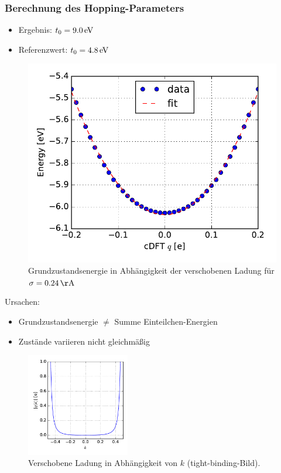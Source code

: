 \begin{frame}
\frametitle{Berechnung des Hopping-Parameters}
\begin{minipage}{0.49\textwidth}
\begin{itemize}
\setlength{\itemsep}{.5cm}
\item Ergebnis: $t_0 = \unit[9.0]{eV}$
\item Referenzwert: $t_0 = \unit[4.8]{eV}$
\end{itemize}
\end{minipage}
\begin{minipage}{0.49\textwidth}
\begin{figure}
\centering
\includegraphics[width = \textwidth]{Images/Hydrogen/charging/energy_fit_normal_sigma}
\caption{Grundzustandsenergie in Abhängigkeit der verschobenen Ladung für $\sigma = \unit[0.24]{\AA}$}
\label{}
\end{figure}
\end{minipage}
\end{frame}

\begin{frame}
Ursachen:
\begin{itemize}
\item Grundzustandsenergie $\neq$ Summe Einteilchen-Energien
\item Zustände variieren nicht gleichmäßig
\end{itemize}
\begin{figure}
	\centering
	\includegraphics[width = 0.4\textwidth]{Images/Hydrogen/charging/charge_vs_k}
	\caption{Verschobene Ladung in Abhängigkeit von $k$ (tight-binding-Bild).}
	\label{image_tight_binding_q_vs_k}
\end{figure}
\end{frame}

